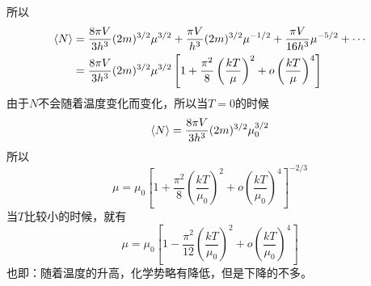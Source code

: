 所以\begin{equation}
    \begin{aligned}
        \braket{N}&=\frac{8\pi V}{3h^3}(2m)^{3/2}  \mu^{3/2} +\frac{\pi V}{h^3}(2m)^{3/2} \mu^{-1/2} +\frac{\pi V}{16h^3} \mu^{-5/2} +\cdots\\
        &= \frac{8\pi V}{3h^3}(2m)^{3/2}  \mu^{3/2}\left[1+\frac
        {\pi^2}{8} \left(\frac{kT}{\mu}\right)^2+o\left(\frac{kT}{\mu}\right)^4\right]
    \end{aligned}
\end{equation}
由于$N$不会随着温度变化而变化，所以当$T=0$的时候\begin{equation}
    \braket{N} = \frac{8\pi V}{3h^3}(2m)^{3/2}  \mu_0^{3/2}
\end{equation}
所以\begin{equation}
    \mu=\mu_0\left[1+\frac
        {\pi^2}{8} \left(\frac{kT}{\mu_0}\right)^2+o\left(\frac{kT}{\mu_0}\right)^4\right]^{-2/3}
\end{equation}
当$T$比较小的时候，就有\begin{equation}
    \mu=\mu_0\left[1-\frac
        {\pi^2}{12} \left(\frac{kT}{\mu_0}\right)^2 +o\left(\frac{kT}{\mu_0}\right)^4\right]
\end{equation}
也即：随着温度的升高，化学势略有降低，但是下降的不多。

